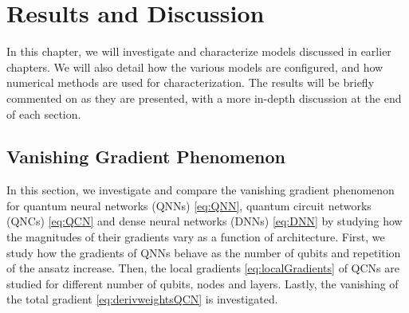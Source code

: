 \chapter{Results and Discussion}\label{chap:results_discussion}
In this chapter, we will investigate and characterize models discussed in earlier chapters. We will also detail how the various models are configured, and how numerical methods are used for characterization. The results will be briefly commented on as they are presented, with a more in-depth discussion at the end of each section.






\section{Vanishing Gradient Phenomenon}\label{sec:Vanishing Gradient Phenomenon}
In this section, we investigate and compare the vanishing gradient phenomenon for quantum neural networks (QNNs) \cref{eq:QNN}, quantum circuit networks (QNCs) \cref{eq:QCN} and dense neural networks (DNNs) \cref{eq:DNN} by studying how the magnitudes of their gradients vary as a function of architecture. First, we study how the gradients of QNNs behave as the number of qubits and repetition of the ansatz increase. Then, the local gradients \cref{eq:localGradients} of QCNs are studied for different number of qubits, nodes and layers. Lastly, the vanishing of the total gradient \cref{eq:derivweightsQCN} is investigated.


